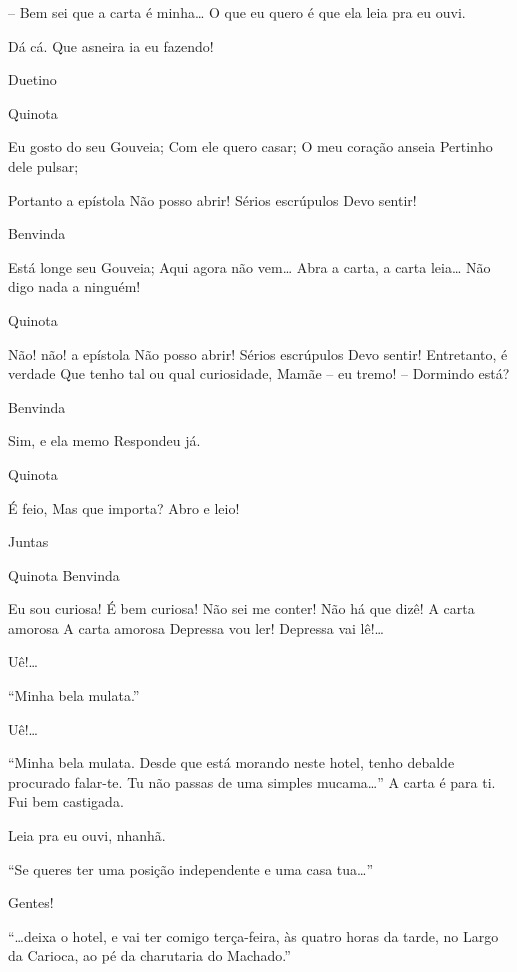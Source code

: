   --
Bem sei que a carta é minha\ldots{} O que eu quero é que ela leia pra eu ouvi.

 Dá cá.  Que
asneira ia eu fazendo!

 Duetino

 Quinota

 Eu gosto do seu Gouveia;
 Com ele quero casar;
 O meu coração anseia
 Pertinho dele pulsar;

 Portanto a epístola
 Não posso abrir!
 Sérios escrúpulos
 Devo sentir!

 Benvinda

 Está longe seu Gouveia;
 Aqui agora não vem\ldots{}
 Abra a carta, a carta leia\ldots{}
 Não digo nada a ninguém!
 
 Quinota
 
 Não! não! a epístola
 Não posso abrir!
 Sérios escrúpulos
 Devo sentir!
 Entretanto, é verdade
 Que tenho tal ou qual curiosidade,
 Mamãe -- eu tremo! --
 Dormindo está?

 Benvinda

 Sim, e ela memo
 Respondeu já. 

 Quinota

 É feio,
 Mas que importa? Abro e leio! 

 Juntas

 Quinota Benvinda

 Eu sou curiosa! É bem curiosa!
 Não sei me conter! Não há que dizê!
 A carta amorosa A carta amorosa
 Depressa vou ler! Depressa vai lê!\ldots{}

 Uê!\ldots{}

  “Minha bela mulata.”

 Uê!\ldots{}

  “Minha bela mulata. Desde que está morando neste hotel,
tenho debalde procurado falar-te. Tu não passas de uma simples mucama\ldots{}”
 A carta é para ti.  Fui bem castigada.

 Leia pra eu ouvi, nhanhã.

  “Se queres ter uma posição independente e uma casa
tua\ldots{}”

 Gentes!

 “\ldots{}deixa o hotel, e vai ter comigo terça-feira, às quatro horas
da tarde, no Largo da Carioca, ao pé da charutaria do Machado.”

